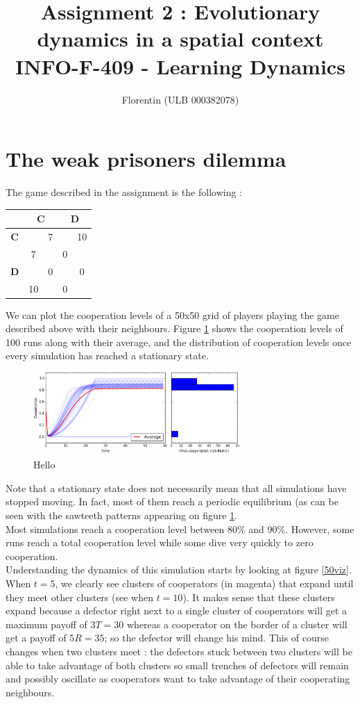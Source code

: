 \documentclass[a4paper]{article}
\title{
    Assignment 2 : Evolutionary dynamics in a spatial context\\
    \small INFO-F-409 - Learning Dynamics
}
\author{Florentin \bsc{Hennecker} (ULB 000382078)}
\date{}
\begin{document}
\maketitle

\section{The weak prisoners dilemma}
The game described in the assignment is the following :
\begin{table}[H]
\centering
\begin{tabular}{c|cc|cc}
	& \multicolumn{2}{c|}{\textbf{C}} & \multicolumn{2}{c}{\textbf{D}}\\
	\hline
	\textbf{C} && 7 && 10\\
	& 7 && 0 &\\
	\hline
	\textbf{D} && 0 && 0\\
	& 10 && 0 &\\
\end{tabular}
\end{table}

We can plot the cooperation levels of a 50x50 grid of players playing the game
described above with their neighbours. Figure \ref{n50} shows the cooperation
levels of 100 runs along with their average, and the distribution of
cooperation levels once every simulation has reached a stationary state.
\begin{figure}[H]
	\centering
	\includegraphics[width=0.7\textwidth]{./fig/n50.png}
	\caption{Hello}
	\label{n50}
\end{figure}
Note that a stationary state does not necessarily mean that all simulations
have stopped moving. In fact, most of them reach a periodic equilibrium (as
can be seen with the sawteeth patterns appearing on figure \ref{n50}.\\

Most simulations reach a cooperation level between 80\% and 90\%. However, some
runs reach a total cooperation level while some dive very quickly to zero
cooperation.\\

Understanding the dynamics of this simulation starts by looking at figure
\ref{50viz}. When $t=5$, we clearly see clusters of cooperators (in magenta)
that expand until they meet other clusters (see when $t=10$). It makes sense
that these clusters expand because a defector right next to a single cluster
of cooperators will get a maximum payoff of $3T=30$ whereas a cooperator on 
the border of a cluster will get a payoff of $5R=35$; so the defector will
change his mind. This of course changes when two clusters meet : the defectors
stuck between two clusters will be able to take advantage of both clusters so
small trenches of defectors will remain and possibly oscillate as cooperators
want to take advantage of their cooperating neighbours.\\
\end{document}
